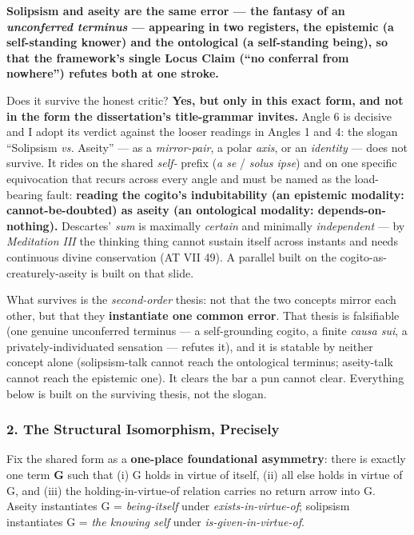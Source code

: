 \documentclass[11pt]{article}
\begin{document}
\textbf{Solipsism and aseity are the same error — the fantasy of an \emph{unconferred terminus} — appearing in two registers, the epistemic (a self-standing knower) and the ontological (a self-standing being), so that the framework's single Locus Claim (``no conferral from nowhere'') refutes both at one stroke.}

Does it survive the honest critic? \textbf{Yes, but only in this exact form, and not in the form the dissertation's title-grammar invites.} Angle 6 is decisive and I adopt its verdict against the looser readings in Angles 1 and 4: the slogan ``Solipsism \emph{vs.} Aseity'' — as a \emph{mirror-pair}, a polar \emph{axis}, or an \emph{identity} — does not survive. It rides on the shared \emph{self-} prefix (\emph{a se} /\allowbreak{} \emph{solus ipse}) and on one specific equivocation that recurs across every angle and must be named as the load-bearing fault: \textbf{reading the cogito's indubitability (an epistemic modality: cannot-be-doubted) as aseity (an ontological modality: depends-on-nothing).} Descartes' \emph{sum} is maximally \emph{certain} and minimally \emph{independent} — by \emph{Meditation III} the thinking thing cannot sustain itself across instants and needs continuous divine conservation (AT VII 49). A parallel built on the cogito-as-creaturely-aseity is built on that slide.

What survives is the \emph{second-order} thesis: not that the two concepts mirror each other, but that they \textbf{instantiate one common error}. That thesis is falsifiable (one genuine unconferred terminus — a self-grounding cogito, a finite \emph{causa sui}, a privately-individuated sensation — refutes it), and it is statable by neither concept alone (solipsism-talk cannot reach the ontological terminus; aseity-talk cannot reach the epistemic one). It clears the bar a pun cannot clear. Everything below is built on the surviving thesis, not the slogan.

\subsubsection*{2. The Structural Isomorphism, Precisely}

Fix the shared form as a \textbf{one-place foundational asymmetry}: there is exactly one term \textbf{G} such that (i) G holds in virtue of itself, (ii) all else holds in virtue of G, and (iii) the holding-in-virtue-of relation carries no return arrow into G. Aseity instantiates G = \emph{being-itself} under \emph{exists-in-virtue-of}; solipsism instantiates G = \emph{the knowing self} under \emph{is-given-in-virtue-of}.
\end{document}

